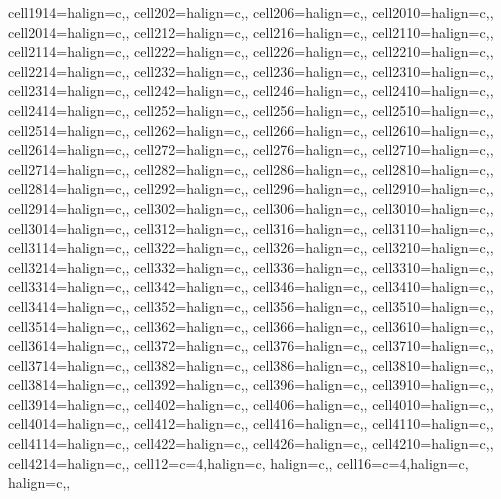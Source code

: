 \begin{table}
\begin{talltblr}
{cell{19}{14}={}{halign=c,},
cell{20}{2}={}{halign=c,},
cell{20}{6}={}{halign=c,},
cell{20}{10}={}{halign=c,},
cell{20}{14}={}{halign=c,},
cell{21}{2}={}{halign=c,},
cell{21}{6}={}{halign=c,},
cell{21}{10}={}{halign=c,},
cell{21}{14}={}{halign=c,},
cell{22}{2}={}{halign=c,},
cell{22}{6}={}{halign=c,},
cell{22}{10}={}{halign=c,},
cell{22}{14}={}{halign=c,},
cell{23}{2}={}{halign=c,},
cell{23}{6}={}{halign=c,},
cell{23}{10}={}{halign=c,},
cell{23}{14}={}{halign=c,},
cell{24}{2}={}{halign=c,},
cell{24}{6}={}{halign=c,},
cell{24}{10}={}{halign=c,},
cell{24}{14}={}{halign=c,},
cell{25}{2}={}{halign=c,},
cell{25}{6}={}{halign=c,},
cell{25}{10}={}{halign=c,},
cell{25}{14}={}{halign=c,},
cell{26}{2}={}{halign=c,},
cell{26}{6}={}{halign=c,},
cell{26}{10}={}{halign=c,},
cell{26}{14}={}{halign=c,},
cell{27}{2}={}{halign=c,},
cell{27}{6}={}{halign=c,},
cell{27}{10}={}{halign=c,},
cell{27}{14}={}{halign=c,},
cell{28}{2}={}{halign=c,},
cell{28}{6}={}{halign=c,},
cell{28}{10}={}{halign=c,},
cell{28}{14}={}{halign=c,},
cell{29}{2}={}{halign=c,},
cell{29}{6}={}{halign=c,},
cell{29}{10}={}{halign=c,},
cell{29}{14}={}{halign=c,},
cell{30}{2}={}{halign=c,},
cell{30}{6}={}{halign=c,},
cell{30}{10}={}{halign=c,},
cell{30}{14}={}{halign=c,},
cell{31}{2}={}{halign=c,},
cell{31}{6}={}{halign=c,},
cell{31}{10}={}{halign=c,},
cell{31}{14}={}{halign=c,},
cell{32}{2}={}{halign=c,},
cell{32}{6}={}{halign=c,},
cell{32}{10}={}{halign=c,},
cell{32}{14}={}{halign=c,},
cell{33}{2}={}{halign=c,},
cell{33}{6}={}{halign=c,},
cell{33}{10}={}{halign=c,},
cell{33}{14}={}{halign=c,},
cell{34}{2}={}{halign=c,},
cell{34}{6}={}{halign=c,},
cell{34}{10}={}{halign=c,},
cell{34}{14}={}{halign=c,},
cell{35}{2}={}{halign=c,},
cell{35}{6}={}{halign=c,},
cell{35}{10}={}{halign=c,},
cell{35}{14}={}{halign=c,},
cell{36}{2}={}{halign=c,},
cell{36}{6}={}{halign=c,},
cell{36}{10}={}{halign=c,},
cell{36}{14}={}{halign=c,},
cell{37}{2}={}{halign=c,},
cell{37}{6}={}{halign=c,},
cell{37}{10}={}{halign=c,},
cell{37}{14}={}{halign=c,},
cell{38}{2}={}{halign=c,},
cell{38}{6}={}{halign=c,},
cell{38}{10}={}{halign=c,},
cell{38}{14}={}{halign=c,},
cell{39}{2}={}{halign=c,},
cell{39}{6}={}{halign=c,},
cell{39}{10}={}{halign=c,},
cell{39}{14}={}{halign=c,},
cell{40}{2}={}{halign=c,},
cell{40}{6}={}{halign=c,},
cell{40}{10}={}{halign=c,},
cell{40}{14}={}{halign=c,},
cell{41}{2}={}{halign=c,},
cell{41}{6}={}{halign=c,},
cell{41}{10}={}{halign=c,},
cell{41}{14}={}{halign=c,},
cell{42}{2}={}{halign=c,},
cell{42}{6}={}{halign=c,},
cell{42}{10}={}{halign=c,},
cell{42}{14}={}{halign=c,},
cell{1}{2}={c=4,}{halign=c, halign=c,},
cell{1}{6}={c=4,}{halign=c, halign=c,},
}
\end{talltblr}
\end{table}
